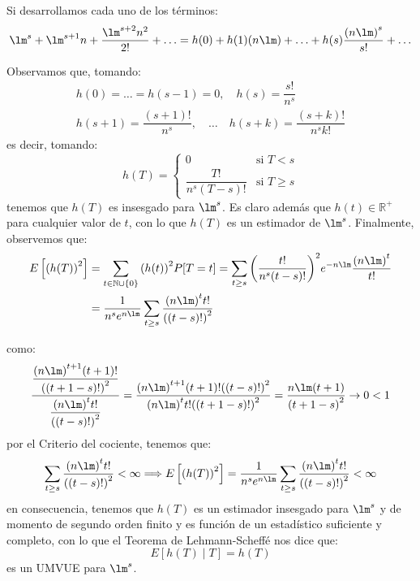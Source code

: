 \begin{ejercicio}
    Si desarrollamos cada uno de los términos:
    \begin{equation*}
        \lm^s + \lm^{s+1}n + \frac{\lm^{s+2}n^2}{2!} + \ldots = h(0) + h(1)(n\lm) + \ldots + h(s)\dfrac{{(n\lm)}^{s}}{s!} + \ldots
    \end{equation*}

    Observamos que, tomando:
    \begin{gather*}
        h(0) = \ldots = h(s-1) = 0,\quad  h(s) = \dfrac{s!}{n^s}\\h(s+1) = \dfrac{(s+1)!}{n^s}, \quad \ldots \quad  h(s+k) = \dfrac{(s+k)!}{n^s k!}
    \end{gather*}
    es decir, tomando:
    \begin{equation*}
        h(T) = \left\{\begin{array}{ll}
            0 & \text{si\ } T<s \\
            \dfrac{T!}{n^s(T-s)!}& \text{si\ } T\geq s
        \end{array}\right. 
    \end{equation*}
    tenemos que $h(T)$ es insesgado para $\lm^s$. Es claro además que $h(t)\in \mathbb{R}^+$ para cualquier valor de $t$, con lo que $h(T)$ es un estimador de $\lm^s$. Finalmente, observemos que:
    \begin{align*}
        E\left[{(h(T))}^{2}\right] &= \sum_{t\in \mathbb{N}\cup \{0\}} {(h(t))}^{2}P[T=t] = \sum_{t\geq s} {\left(\dfrac{t!}{n^s(t-s)!}\right)}^{2} e^{-n\lm} \dfrac{{(n\lm)}^{t}}{t!} \\ &= \dfrac{1}{n^s e^{n\lm}} \sum_{t\geq s} \dfrac{{(n\lm)}^{t}t!}{{((t-s)!)}^{2}}
    \end{align*}

    como:
    \begin{equation*}
        \dfrac{\dfrac{{(n\lm)}^{t+1}(t+1)!}{{((t+1-s)!)}^{2}}}{\dfrac{{(n\lm)}^{t}t!}{{((t-s)!)}^{2}}} = \dfrac{{(n\lm)}^{t+1}(t+1)!{((t-s)!)}^{2}}{{(n\lm)}^{t}t!{((t+1-s)!)}^{2}} = \dfrac{n\lm(t+1)}{{(t+1-s)}^{2}} \to 0 < 1
    \end{equation*}
    por el Criterio del cociente, tenemos que:
    \begin{equation*}
        \sum_{t\geq s} \dfrac{{(n\lm)}^{t}t!}{{((t-s)!)}^{2}} < \infty \Longrightarrow E\left[{(h(T))}^{2}\right]  =\dfrac{1}{n^s e^{n\lm}}\sum_{t\geq s} \dfrac{{(n\lm)}^{t}t!}{{((t-s)!)}^{2}}   < \infty
    \end{equation*}
    en consecuencia, tenemos que $h(T)$ es un estimador insesgado para $\lm^s$ y de momento de segundo orden finito y es función de un estadístico suficiente y completo, con lo que el Teorema de Lehmann-Scheffé nos dice que:
    \begin{equation*}
        E[h(T)\mid T] = h(T)
    \end{equation*}
    es un UMVUE para $\lm^s$.
\end{ejercicio}

